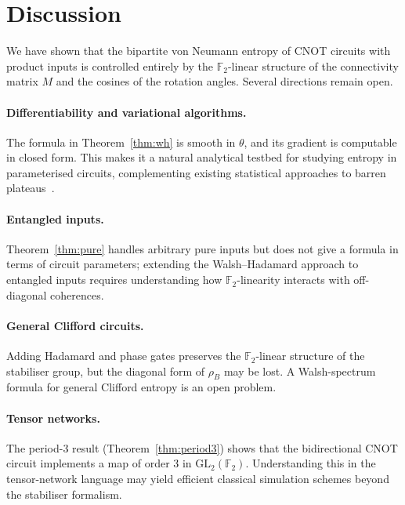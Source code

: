 \documentclass[11pt,a4paper]{article}
\newcommand{\F}{\mathbb{F}}
\begin{document}
\section{Discussion}
\label{sec:discussion}

We have shown that the bipartite von Neumann entropy of CNOT circuits with
product inputs is controlled entirely by the $\F_2$-linear structure of the
connectivity matrix $M$ and the cosines of the rotation angles.  Several
directions remain open.

\paragraph{Differentiability and variational algorithms.}
The formula in Theorem~\ref{thm:wh} is smooth in $\theta$, and its gradient
is computable in closed form.  This makes it a natural analytical testbed for
studying entropy in parameterised circuits, complementing existing statistical
approaches to barren plateaus~\cite{mcclean2018barren}.

\paragraph{Entangled inputs.}
Theorem~\ref{thm:pure} handles arbitrary pure inputs but does not give a
formula in terms of circuit parameters; extending the Walsh–Hadamard approach
to entangled inputs requires understanding how $\F_2$-linearity interacts with
off-diagonal coherences.

\paragraph{General Clifford circuits.}
Adding Hadamard and phase gates preserves the $\F_2$-linear structure of the
stabiliser group, but the diagonal form of $\rho_B$ may be lost.
A Walsh-spectrum formula for general Clifford entropy is an open problem.

\paragraph{Tensor networks.}
The period-3 result (Theorem~\ref{thm:period3}) shows that the bidirectional
CNOT circuit implements a map of order 3 in $\mathrm{GL}_2(\F_2)$.
Understanding this in the tensor-network language may yield efficient classical
simulation schemes beyond the stabiliser formalism.
\end{document}
